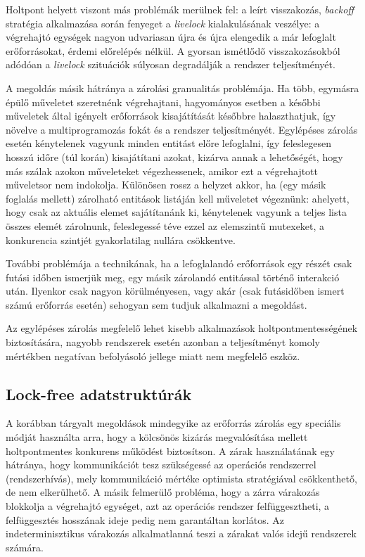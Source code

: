     Holtpont helyett viszont más problémák merülnek fel: a leírt visszakozás, \emph{backoff} stratégia alkalmazása során fenyeget a \emph{livelock} kialakulásának veszélye: a végrehajtó egységek nagyon udvariasan újra és újra elengedik a már lefoglalt erőforrásokat, érdemi előrelépés nélkül. A gyorsan ismétlődő visszakozásokból adódóan a \emph{livelock} szituációk súlyosan degradálják a rendszer teljesítményét.
    
    A megoldás másik hátránya a zárolási granualitás problémája. Ha több, egymásra épülő műveletet szeretnénk végrehajtani, hagyományos esetben a későbbi műveletek által igényelt erőforrások kisajátítását későbbre halaszthatjuk, így növelve a multiprogramozás fokát és a rendszer teljesítményét. Egylépéses zárolás esetén kénytelenek vagyunk minden entitást előre lefoglalni, így feleslegesen hosszú időre (túl korán) kisajátítani azokat, kizárva annak a lehetőségét, hogy más szálak azokon műveleteket végezhessenek, amikor ezt a végrehajtott műveletsor nem indokolja. Különösen rossz a helyzet akkor, ha (egy másik foglalás mellett) zárolható entitások listáján kell műveletet végeznünk: ahelyett, hogy csak az aktuális elemet sajátítanánk ki, kénytelenek vagyunk a teljes lista összes elemét zárolnunk, feleslegessé téve ezzel az elemszintű mutexeket, a konkurencia szintjét gyakorlatilag nullára csökkentve.
    
    További problémája a technikának, ha a lefoglalandó erőforrások egy részét csak futási időben ismerjük meg, egy másik zárolandó entitással történő interakció után. Ilyenkor csak nagyon körülményesen, vagy akár (csak futásidőben ismert számú erőforrás esetén) sehogyan sem tudjuk alkalmazni a megoldást.
    
    Az egylépéses zárolás megfelelő lehet kisebb alkalmazások holtpontmentességének biztosítására, nagyobb rendszerek esetén azonban a teljesítményt komoly mértékben negatívan befolyásoló jellege miatt nem megfelelő eszköz.
    
    \subsection{Lock-free adatstruktúrák}
    \label{seq:lockfree}
     
    A korábban tárgyalt megoldások mindegyike az erőforrás zárolás egy speciális módját használta arra, hogy a kölcsönös kizárás megvalósítása mellett holtpontmentes konkurens működést biztosítson. A zárak használatának egy hátránya, hogy kommunikációt tesz szükségessé az operációs rendszerrel (rendszerhívás), mely kommunikáció mértéke optimista stratégiával csökkenthető, de nem elkerülhető. A másik felmerülő probléma, hogy a zárra várakozás blokkolja a végrehajtó egységet, azt az operációs rendszer felfüggesztheti, a felfüggesztés hosszának ideje pedig nem garantáltan korlátos. Az indeterminisztikus várakozás alkalmatlanná teszi a zárakat valós idejű rendszerek számára.
    
